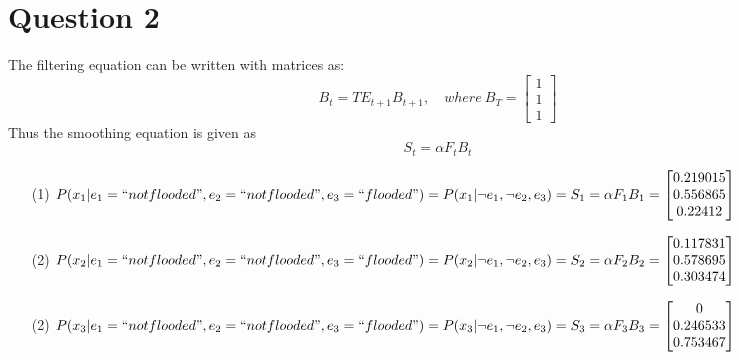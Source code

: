 \documentclass[letter, 9pt]{article}
\begin{document}
\section*{Question 2} The filtering equation can be written with matrices as:
\begin{equation*}
    B_t = TE_{t+1}B_{t+1}, \quad where\ B_T = \begin{bmatrix}1\\1\\1\end{bmatrix}
\end{equation*}
Thus the smoothing equation is given as 
\begin{equation*}
    S_t = \alpha F_t B_t
\end{equation*}
\begin{itemize}
    \item[(1)] $P(x_1|e_1=``not flooded", e_2=``not flooded", e_3=``flooded") = P(x_1| \neg e_1, \neg e_2, e_3) = S_1 = \alpha F_1B_1 = 
    \begin{bmatrix}
        0.219015\\
        0.556865\\
        0.22412
    \end{bmatrix}$
    \item[(2)] $P(x_2|e_1=``not flooded", e_2=``not flooded", e_3=``flooded") = P(x_2| \neg e_1, \neg e_2, e_3) = S_2 = \alpha F_2B_2 = 
    \begin{bmatrix}
        0.117831\\
        0.578695\\
        0.303474
    \end{bmatrix}$
    \item[(2)] $P(x_3|e_1=``not flooded", e_2=``not flooded", e_3=``flooded") = P(x_3| \neg e_1, \neg e_2, e_3) = S_3 = \alpha F_3B_3 = 
    \begin{bmatrix}
        0\\
        0.246533\\
        0.753467
    \end{bmatrix}$
\end{itemize}
\end{document}

